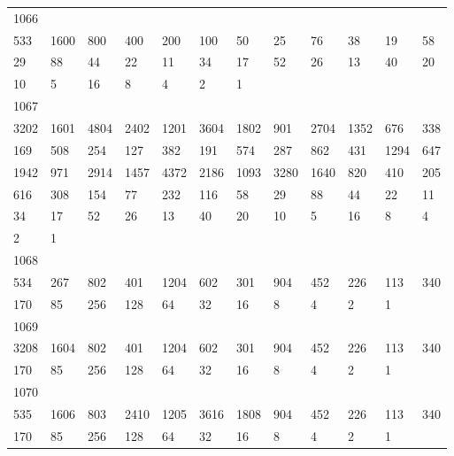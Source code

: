 \begin{longtable}{llllllllllll}
1066&&&&&&&&&&&\\
533& 1600& 800& 400& 200& 100& 50& 25& 76& 38& 19& 58\\
29& 88& 44& 22& 11& 34& 17& 52& 26& 13& 40& 20\\
10& 5& 16& 8& 4& 2& 1& \\

1067&&&&&&&&&&&\\
3202& 1601& 4804& 2402& 1201& 3604& 1802& 901& 2704& 1352& 676& 338\\
169& 508& 254& 127& 382& 191& 574& 287& 862& 431& 1294& 647\\
1942& 971& 2914& 1457& 4372& 2186& 1093& 3280& 1640& 820& 410& 205\\
616& 308& 154& 77& 232& 116& 58& 29& 88& 44& 22& 11\\
34& 17& 52& 26& 13& 40& 20& 10& 5& 16& 8& 4\\
2& 1& \\

1068&&&&&&&&&&&\\
534& 267& 802& 401& 1204& 602& 301& 904& 452& 226& 113& 340\\
170& 85& 256& 128& 64& 32& 16& 8& 4& 2& 1& \\

1069&&&&&&&&&&&\\
3208& 1604& 802& 401& 1204& 602& 301& 904& 452& 226& 113& 340\\
170& 85& 256& 128& 64& 32& 16& 8& 4& 2& 1& \\

1070&&&&&&&&&&&\\
535& 1606& 803& 2410& 1205& 3616& 1808& 904& 452& 226& 113& 340\\
170& 85& 256& 128& 64& 32& 16& 8& 4& 2& 1& \\


\end{longtable}
